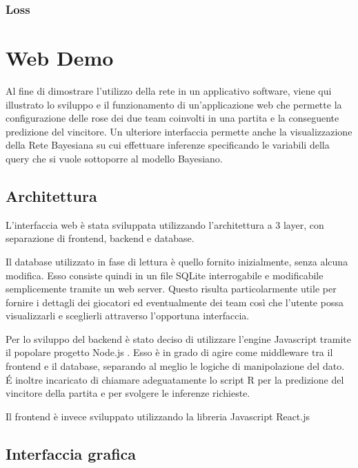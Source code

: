 \documentclass[hidelinks, 12pt]{article}
\begin{document}
\subsubsection{Loss}



\clearpage



\section{Web Demo}

Al fine di dimostrare l'utilizzo della rete in un applicativo software, viene qui illustrato lo sviluppo e il funzionamento di un'applicazione web che permette la configurazione delle rose dei due team coinvolti in una partita e la conseguente predizione del vincitore. Un ulteriore interfaccia permette anche la visualizzazione della Rete Bayesiana su cui effettuare inferenze specificando le variabili della query che si vuole sottoporre al modello Bayesiano.



\subsection{Architettura}

L'interfaccia web è stata sviluppata utilizzando l'architettura a 3 layer, con separazione di frontend, backend e database.

Il database utilizzato in fase di lettura è quello fornito inizialmente, senza alcuna modifica. Esso consiste quindi in un file SQLite interrogabile e modificabile semplicemente tramite un web server. Questo risulta particolarmente utile per fornire i dettagli dei giocatori ed eventualmente dei team così che l'utente possa visualizzarli e sceglierli attraverso l'opportuna interfaccia.

Per lo sviluppo del backend è stato deciso di utilizzare l'engine Javascript tramite il popolare progetto Node.js \cite{site:nodejs}. Esso è in grado di agire come middleware tra il frontend e il database, separando al meglio le logiche di manipolazione del dato. \'E inoltre incaricato di chiamare adeguatamente lo script R per la predizione del vincitore della partita e per svolgere le inferenze richieste.

Il frontend è invece sviluppato utilizzando la libreria Javascript React.js \cite{site:react}



\subsection{Interfaccia grafica}
\end{document}
